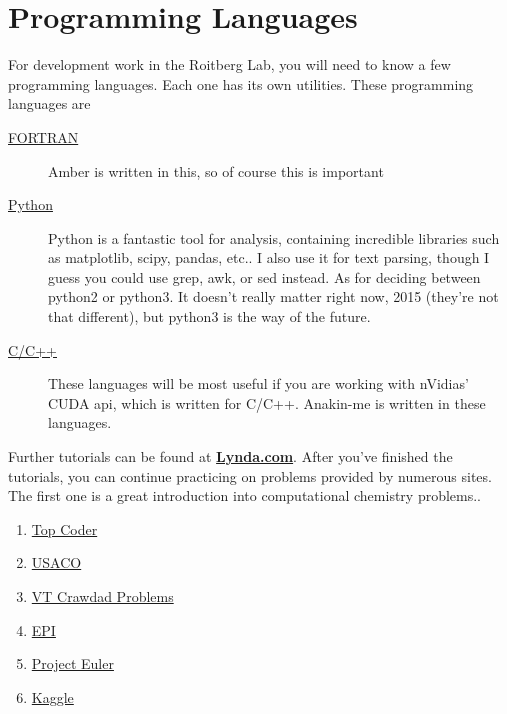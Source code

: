 \documentclass{article}
\begin{document}
\section*{Programming Languages}

For development work in the Roitberg Lab, you will need to know a few programming languages.
Each one has its own utilities. These programming languages are

\begin{description}
  \item[\href{http://www.fortrantutorial.com/}{FORTRAN}] Amber is written in this, so of course this is important
  \item[\href{https://docs.python.org/3/tutorial/}{Python}] Python is a fantastic tool for analysis, containing incredible libraries such as matplotlib, scipy, pandas, etc..
    I also use it for text parsing, though I guess you could use grep, awk, or sed instead.
    As for deciding between python2 or python3. It doesn't really matter right now, 2015 (they're not that different), but python3 is the way of the future.
  \item[\href{http://www.cplusplus.com/doc/tutorial/introduction/}{C/C++}] These languages will be most useful if you are working with nVidias' CUDA api, which is written for C/C++.
    Anakin-me is written in these languages.
\end{description}

Further tutorials can be found at \href{https://training.it.ufl.edu/services/lynda/}{\textbf{Lynda.com}}.
After you've finished the tutorials, you can continue practicing on problems provided by numerous sites.
The first one is a great introduction into computational chemistry problems..

\begin{enumerate}
  \item \href{https://www.topcoder.com/}{Top Coder}
  \item \href{http://train.usaco.org/usacogate}{USACO}
  \item \href{http://sirius.chem.vt.edu/wiki/doku.php?id=crawdad:programming}{VT Crawdad Problems}
  \item \href{http://www.amazon.com/Elements-Programming-Interviews-Insiders-Guide/dp/1479274836/ref=sr\_1\_3?s=books&ie=UTF8&qid=1446406481&sr=1-3&keywords=cracking+the+coding+interview}{EPI}
  \item \href{https://projecteuler.net/}{Project Euler}
  \item \href{https://www.kaggle.com/}{Kaggle}
\end{enumerate}
\end{document}
